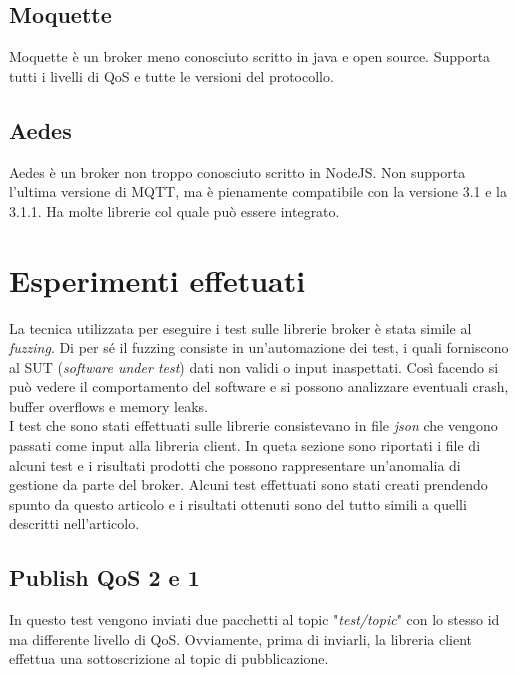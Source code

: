 \documentclass[binding=0.6cm,TFA]{sapthesis}
\begin{document}
\begin{large}
\subsection{Moquette}
Moquette \cite{Moquette} è un broker meno conosciuto scritto in java e open source. Supporta tutti i livelli di QoS e tutte le versioni del protocollo.

\subsection{Aedes}
Aedes \cite{Aedes} è un broker non troppo conosciuto scritto in NodeJS. Non supporta l'ultima versione di MQTT, ma è pienamente compatibile con la versione 3.1 e la 3.1.1. Ha molte librerie col quale può essere integrato.

\section{Esperimenti effetuati}
La tecnica utilizzata per eseguire i test sulle librerie broker è stata simile al \textit{fuzzing}. Di per sé il fuzzing consiste in un'automazione dei test, i quali forniscono al SUT (\textit{software under test}) dati non validi o input inaspettati. Così facendo si può vedere il comportamento del software e si possono analizzare eventuali crash, buffer overflows e memory leaks. \\

I test che sono stati effettuati sulle librerie consistevano in file \textit{json} che vengono passati come input alla libreria client. In queta sezione sono riportati i file di alcuni test e i risultati prodotti che possono rappresentare un'anomalia di gestione da parte del broker.
Alcuni test effettuati sono stati creati prendendo spunto da questo articolo \cite{articleTestsMQTT} e i risultati ottenuti sono del tutto simili a quelli descritti nell'articolo.
\newpage

\subsection{Publish QoS 2 e 1}

\begin{python}
\end{python}
In questo test vengono inviati due pacchetti al topic "\textit{test/topic}" con lo stesso id ma differente livello di QoS. Ovviamente, prima di inviarli, la libreria client effettua una sottoscrizione al topic di pubblicazione. \\


\end{large}
\end{document}

